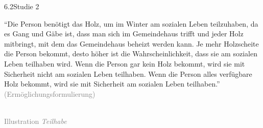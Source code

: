 \documentclass[xcolor=table,9pt,aspectratio=169]{beamer}
\begin{document}
\begin{frame}{\vspace*{10mm}6.2\hspace*{1em}Studie 2}
\begin{multicols}{2}
   \enquote{Die Person benötigt das Holz, um im Winter am sozialen Leben teilzuhaben, da es Gang und Gäbe ist, dass man sich im Gemeindehaus trifft und jeder Holz mitbringt, mit dem das Gemeindehaus beheizt werden kann. Je mehr Holzscheite die Person bekommt, desto höher ist die Wahrscheinlichkeit, dass sie am sozialen Leben teilhaben wird. Wenn die Person gar kein Holz bekommt, wird sie mit Sicherheit nicht am sozialen Leben teilhaben. Wenn die Person alles verfügbare Holz bekommt, wird sie mit Sicherheit am sozialen Leben teilhaben.}\\
   \medskip
   \textcolor{gray}{(Ermöglichungsformulierung)}
   \vfill
   \begin{center}
      \\
      \textcolor{gray}{Illustration \textit{Teilhabe}}
   \end{center}
\end{multicols}
\end{frame}
\end{document}

